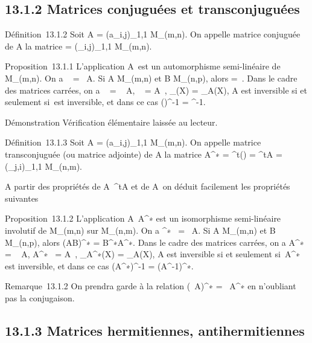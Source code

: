 \subsection{13.1.2 Matrices conjuguées et transconjuguées}

Définition~13.1.2 Soit A = (a_i,j)_1\leqi\leqm,1\leqj\leqn \in
M_(m,n). On appelle matrice conjuguée de A la matrice
\overlineA =
(\overlinea_i,j)_1\leqi\leqm,1\leqj\leqn \in
M_(m,n).

Proposition~13.1.1 L'application
A\mapsto~\overlineA est un
automorphisme semi-linéaire de M_(m,n). On a
\mathrmrg\overlineA~
= \mathrmrg~A. Si A \in
M_(m,n) et B \in M_(n,p), alors
\overlineAB =
\overlineA\,\overlineB.
Dans le cadre des matrices carrées, on a
~
\overlineA =
\overline{}~
A,
\overlineA~
=
\overline{}A~,
\chi_\overlineA(X) =
\overline\chi_A(X), A est inversible si et
seulement si~\overlineA est inversible, et dans ce
cas (\overlineA)^-1 =
\overlineA^-1.

Démonstration Vérification élémentaire laissée au lecteur.

Définition~13.1.3 Soit A = (a_i,j)_1\leqi\leqm,1\leqj\leqn \in
M_(m,n). On appelle matrice transconjuguée (ou matrice
adjointe) de A la matrice A^∗ =
^t(\overlineA) =
\overline^tA =
(\overlinea_j,i)_1\leqi\leqm,1\leqj\leqn \in
M_(n,m).

A partir des propriétés de A\mapsto~^tA
et de A\mapsto~\overlineA on
déduit facilement les propriétés suivantes

Proposition~13.1.2 L'application
A\mapsto~A^∗ est un isomorphisme
semi-linéaire involutif de M_(m,n) sur M_(n,m). On a
\mathrmrgA^∗~
= \mathrmrg~A. Si A \in
M_(m,n) et B \in M_(n,p), alors (AB)^∗ =
B^∗A^∗. Dans le cadre des matrices carrées, on a
 A^∗~ =
\overline{}~
A,
A^∗~ =
\overline{}A~,
\chi_A^∗(X) =
\overline\chi_A(X), A est inversible si et
seulement si~A^∗ est inversible, et dans ce cas
(A^∗)^-1 = (A^-1)^∗.

Remarque~13.1.2 On prendra garde à la relation (\lambda~A)^∗ =
\overline\lambda~A^∗ en n'oubliant pas la
conjugaison.

\subsection{13.1.3 Matrices hermitiennes, antihermitiennes}

